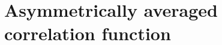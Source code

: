 \documentclass[letterpaper,twocolumn,amsmath,amssymb,jcp,10pt,aip]{revtex4-1}
\begin{document}
  


\section{Asymmetrically averaged correlation function}\label{sec:g-A}
\end{document}
